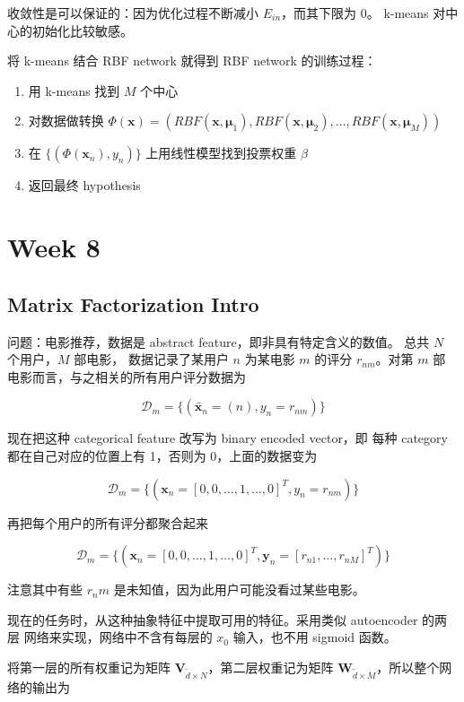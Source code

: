 \documentclass[a4paper]{article}
\begin{document}
收敛性是可以保证的：因为优化过程不断减小 $E_{in}$，而其下限为 0。
k-means 对中心的初始化比较敏感。

将 k-means 结合 RBF network 就得到 RBF network 的训练过程：

\begin{enumerate}
  \item 用 k-means 找到 $M$ 个中心\\
  \item 对数据做转换 $\Phi(\mathbf{x})=(RBF(\mathbf{x},\bm{\mu}_1),RBF(\mathbf{x},\bm{\mu}_2),\dots,RBF(\mathbf{x},\bm{\mu}_M))$\\
  \item 在 $\{(\Phi(\mathbf{x}_n), y_n)\}$ 上用线性模型找到投票权重 $\beta$\\
  \item 返回最终 hypothesis\\
\end{enumerate}


\section{Week 8}
\subsection{Matrix Factorization Intro}
问题：电影推荐，数据是 abstract feature，即非具有特定含义的数值。
总共 $N$ 个用户，$M$ 部电影，
数据记录了某用户 $n$ 为某电影 $m$ 的评分 $r_{nm}$。对第 $m$ 部
电影而言，与之相关的所有用户评分数据为

$$\mathcal{D}_m = \{(\tilde{\mathbf{x}_n}=(n), y_n=r_{nm})\}$$

现在把这种 categorical feature 改写为 binary encoded vector，即
每种 category 都在自己对应的位置上有 1，否则为 0，上面的数据变为

$$\mathcal{D}_m = \{(\mathbf{x}_n=[0, 0, \dots, 1, \dots, 0]^T, y_n=r_{nm})\}$$

再把每个用户的所有评分都聚合起来

$$\mathcal{D}_m = \{(\mathbf{x}_n=[0, 0, \dots, 1, \dots, 0]^T, \mathbf{y}_n=[r_{n1}, \dots, r_{nM}]^T)\}$$

注意其中有些 $r_nm$ 是未知值，因为此用户可能没看过某些电影。

现在的任务时，从这种抽象特征中提取可用的特征。采用类似 autoencoder 的两层
网络来实现，网络中不含有每层的 $x_0$ 输入，也不用 sigmoid 函数。

将第一层的所有权重记为矩阵 $\mathbf{V}_{\tilde{d}\times N}$，第二层权重记为矩阵
$\mathbf{W}_{\tilde{d}\times M}$，所以整个网络的输出为
\end{document}
